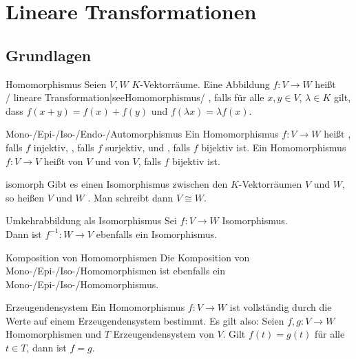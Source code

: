 \section{%
    Lineare Transformationen%
}

\subsection{%
    Grundlagen%
}

\begin{Def}{Homomorphismus}
    Seien $V, W$ $K$-Vektorräume.
    Eine Abbildung $f: V \rightarrow W$ heißt \\
    /%
    {lineare Transformation|see{Homomorphismus}}/%
    , falls für
    alle $x, y \in V$, $\lambda \in K$ gilt, dass
    $f(x + y) = f(x) + f(y)$ und $f(\lambda x) = \lambda f(x)$.
\end{Def}

\begin{Def}{Mono-/Epi-/Iso-/Endo-/Automorphismus}
    Ein Homomorphismus $f: V \rightarrow W$ heißt
    , falls $f$ injektiv,
    , falls $f$ surjektiv, und
    , falls $f$ bijektiv ist.
    Ein Homomorphismus $f: V \rightarrow V$ heißt 
    von $V$ und  von $V$, falls $f$ bijektiv ist.
\end{Def}

\begin{Def}{isomorph}
    Gibt es einen Isomorphismus zwischen den $K$-Vektorräumen $V$ und $W$,
    so heißen $V$ und $W$ .
    Man schreibt dann $V \cong W$.
\end{Def}

\begin{Satz}{Umkehrabbildung als Isomorphismus}
    Sei $f: V \rightarrow W$ Isomorphismus. \\
    Dann ist $f^{-1}: W \rightarrow V$ ebenfalls ein Isomorphismus.
\end{Satz}

\begin{Satz}{Komposition von Homomorphismen}
    Die Komposition von Mono-/Epi-/Iso-/Homomor\-phismen ist ebenfalls ein
    Mono-/Epi-/Iso-/Homomorphismus.
\end{Satz}

\begin{Satz}{Erzeugendensystem}
    Ein Homomorphismus $f: V \rightarrow W$ ist vollständig durch die Werte
    auf einem Erzeugendensystem bestimmt.
    Es gilt also:
    Seien $f, g: V \rightarrow W$ Homomorphismen und $T$
    Erzeugendensystem von $V$.
    Gilt $f(t) = g(t)$ für alle $t \in T$, dann ist $f = g$.
\end{Satz}

